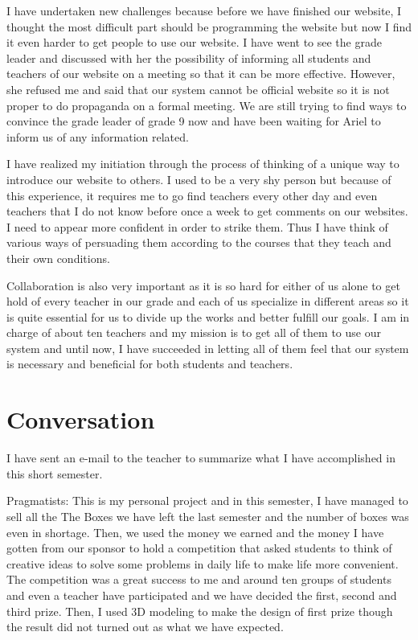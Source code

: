 \documentclass[11pt,a4paper,titlepage]{article}
\begin{document}
I have undertaken new challenges because before we have finished our website, I thought the most difficult part should be programming the website but now I find it even harder to get people to use our website. I have went to see the grade leader and discussed with her the possibility of informing all students and teachers of our website on a meeting so that it can be more effective. However, she refused me and said that our system cannot be official website so it is not proper to do propaganda on a formal meeting. We are still trying to find ways to convince the grade leader of grade 9 now and have been waiting for Ariel to inform us of any information related.

I have realized my initiation through the process of thinking of a unique way to introduce our website to others. I used to be a very shy person but because of this experience, it requires me to go find teachers every other day and even teachers that I do not know before once a week to get comments on our websites. I need to appear more confident in order to strike them. Thus I have think of various ways of persuading them according to the courses that they teach and their own conditions. 

Collaboration is also very important as it is so hard for either of us alone to get hold of every teacher in our grade and each of us specialize in different areas so it is quite essential for us to divide up the works and better fulfill our goals. I am in charge of about ten teachers and my mission is to get all of them to use our system and until now, I have succeeded in letting all of them feel that  our system is necessary and beneficial for both students and teachers.

\section{Conversation}
I have sent an e-mail to the teacher to summarize what I have accomplished in this short semester. 

Pragmatists: 
This is my personal project and in this semester, I have managed to sell all the The Boxes we have left the last semester and the number of boxes was even in shortage. Then, we used the money we earned and the money I have gotten from our sponsor to hold a competition that asked students to think of creative ideas to solve some problems in daily life to make life more convenient. The competition was a great success to me and around ten groups of students and even a teacher have participated and we have decided the first, second and third prize. Then, I used 3D modeling to make the design of first prize though the result did not turned out as what we have expected.
\end{document}
